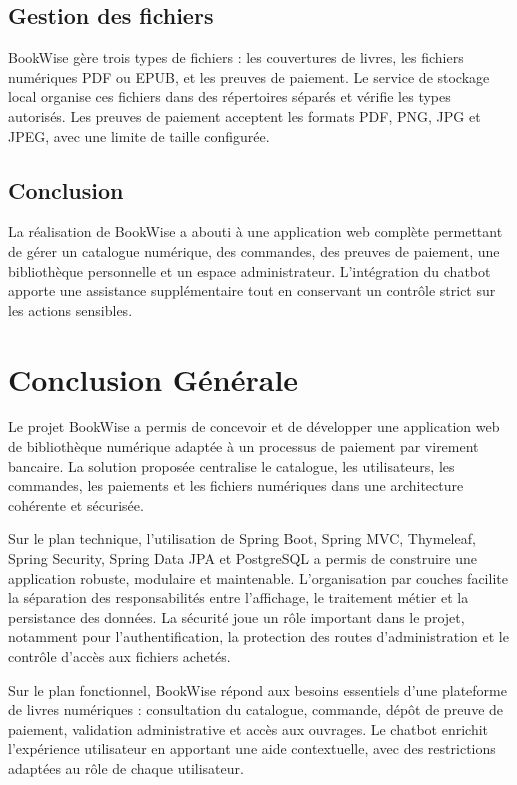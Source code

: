 \documentclass[12pt,a4paper]{report}
\newcommand{\chapterconclusion}[1]{
    \section*{Conclusion}
    \vspace{-0.5em}
    \addcontentsline{toc}{section}{Conclusion}
    #1
}
\begin{document}
\section{Gestion des fichiers}

BookWise gère trois types de fichiers : les couvertures de livres, les fichiers numériques PDF ou EPUB, et les preuves de paiement. Le service de stockage local organise ces fichiers dans des répertoires séparés et vérifie les types autorisés. Les preuves de paiement acceptent les formats PDF, PNG, JPG et JPEG, avec une limite de taille configurée.

\chapterconclusion{
La réalisation de BookWise a abouti à une application web complète permettant de gérer un catalogue numérique, des commandes, des preuves de paiement, une bibliothèque personnelle et un espace administrateur. L'intégration du chatbot apporte une assistance supplémentaire tout en conservant un contrôle strict sur les actions sensibles.
}

\chapter*{Conclusion Générale}

Le projet BookWise a permis de concevoir et de développer une application web de bibliothèque numérique adaptée à un processus de paiement par virement bancaire. La solution proposée centralise le catalogue, les utilisateurs, les commandes, les paiements et les fichiers numériques dans une architecture cohérente et sécurisée.

Sur le plan technique, l'utilisation de Spring Boot, Spring MVC, Thymeleaf, Spring Security, Spring Data JPA et PostgreSQL a permis de construire une application robuste, modulaire et maintenable. L'organisation par couches facilite la séparation des responsabilités entre l'affichage, le traitement métier et la persistance des données. La sécurité joue un rôle important dans le projet, notamment pour l'authentification, la protection des routes d'administration et le contrôle d'accès aux fichiers achetés.

Sur le plan fonctionnel, BookWise répond aux besoins essentiels d'une plateforme de livres numériques : consultation du catalogue, commande, dépôt de preuve de paiement, validation administrative et accès aux ouvrages. Le chatbot enrichit l'expérience utilisateur en apportant une aide contextuelle, avec des restrictions adaptées au rôle de chaque utilisateur.
\end{document}
